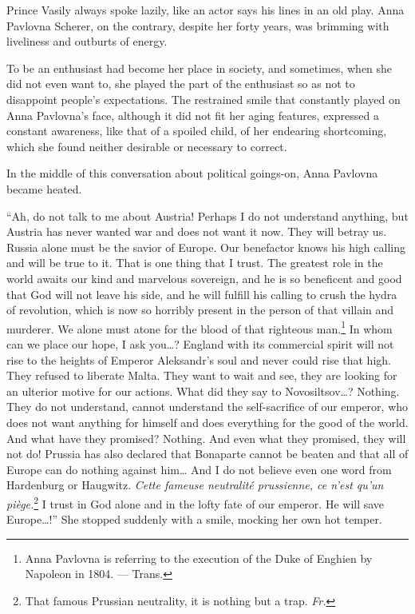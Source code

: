 Prince Vasily always spoke lazily, like an actor says his lines in an
old play. Anna Pavlovna Scherer, on the contrary, despite her forty
years, was brimming with liveliness and outburts of energy.

To be an enthusiast had become her place in society, and sometimes,
when she did not even want to, she played the part of the enthusiast
so as not to disappoint people's expectations. The restrained smile
that constantly played on Anna Pavlovna's face, although it did not
fit her aging features, expressed a constant awareness, like that of a
spoiled child, of her endearing shortcoming, which she found neither
desirable or necessary to correct.

In the middle of this conversation about political goings-on, Anna
Pavlovna became heated.

``Ah, do not talk to me about Austria! Perhaps I do not understand
anything, but Austria has never wanted war and does not want it
now. They will betray us. Russia alone must be the savior of
Europe. Our benefactor knows his high calling and will be true to
it. That is one thing that I trust. The greatest role in the world
awaits our kind and marvelous sovereign, and he is so beneficent and
good that God will not leave his side, and he will fulfill his calling
to crush the hydra of revolution, which is now so horribly present in
the person of that villain and murderer. We alone must atone for the
blood of that righteous man.\footnote{Anna Pavlovna is referring to
  the execution of the Duke of Enghien by Napoleon in 1804. ---
  Trans.} In whom can we place our hope, I ask you\ldots{}? England
with its commercial spirit will not rise to the heights of Emperor
Aleksandr's soul and never could rise that high. They refused to
liberate Malta. They want to wait and see, they are looking for an
ulterior motive for our actions. What did they say to
Novosiltsov\ldots{}? Nothing. They do not understand, cannot
understand the self-sacrifice of our emperor, who does not want
anything for himself and does everything for the good of the
world. And what have they promised? Nothing. And even what they
promised, they will not do! Prussia has also declared that Bonaparte
cannot be beaten and that all of Europe can do nothing against
him\ldots{} And I do not believe even one word from Hardenburg or
Haugwitz. \textit{Cette fameuse neutralit\'e prussienne, ce n'est
  qu'un pi\`ege.}\footnote{That famous Prussian neutrality, it is
  nothing but a trap. \textit{Fr.}} I trust in God alone and in the
lofty fate of our emperor. He will save Europe\ldots{}!'' She stopped
suddenly with a smile, mocking her own hot temper. %


